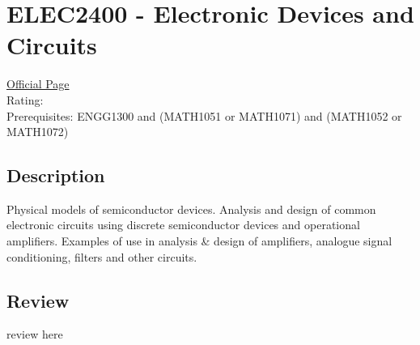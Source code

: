 \hypertarget{ELEC2400}{\section{ELEC2400 - Electronic Devices and Circuits}}

\large
\textcolor{turbo_purple}{\href{https://my.uq.edu.au/programs-courses/course.html?course_code=ELEC2400}{Official Page}} \\
Rating: \cstar\cstar\cstar\cstar\ostar \\
Prerequisites: ENGG1300 and (MATH1051 or MATH1071) and (MATH1052 or MATH1072)

\normalsize
\subsection*{Description}
Physical models of semiconductor devices.
Analysis and design of common electronic circuits using discrete semiconductor devices and operational amplifiers.
Examples of use in analysis \& design of amplifiers, analogue signal conditioning, filters and other circuits.

\subsection*{Review}
review here
